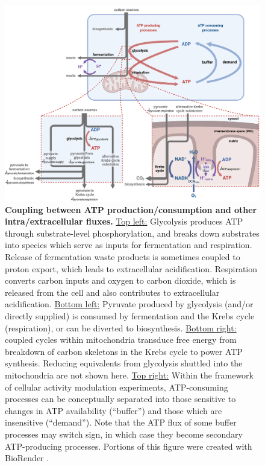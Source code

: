 \documentclass{compactarticle}
\begin{document}
\begin{figure}[!htpb]
    \centering
    \includegraphics[width=\textwidth]{fig/fig2.pdf}
    \caption{\textbf{Coupling between ATP production/consumption and other intra/extracellular fluxes.} \underline{Top left:} Glycolysis produces ATP through substrate-level phosphorylation, and breaks down substrates into species which serve as inputs for fermentation and respiration. Release of fermentation waste products is sometimes coupled to proton export, which leads to extracellular acidification. Respiration converts carbon inputs and oxygen to carbon dioxide, which is released from the cell and also contributes to extracellular acidification. \underline{Bottom left:} Pyruvate produced by glycolysis (and/or directly supplied) is consumed by fermentation and the Krebs cycle (respiration), or can be diverted to biosynthesis. \underline{Bottom right:} coupled cycles within mitochondria transduce free energy from breakdown of carbon skeletons in the Krebs cycle to power ATP synthesis. Reducing equivalents from glycolysis shuttled into the mitochondria are not shown here. \underline{Top right:} Within the framework of cellular activity modulation experiments, ATP-consuming processes can be conceptually separated into those sensitive to changes in ATP availability (``buffer'') and those which are insensitive (``demand''). Note that the ATP flux of some buffer processes may switch sign, in which case they become secondary ATP-producing processes. Portions of this figure were created with BioRender \cite{biorender}.}
    \label{fig:carbon_and_mito_detail}
\end{figure}
\end{document}
